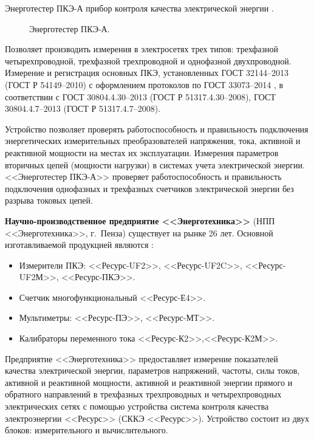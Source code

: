 Энерготестер ПКЭ-А прибор контроля качества электрической энергии \cite{energy_tester}.
\begin{figure}[ht]
	\caption{Энерготестер ПКЭ-А.}\label{fig:picture10}
\end{figure}
Позволяет производить измерения в электросетях трех типов: трехфазной четырехпроводной, трехфазной трехпроводной и однофазной двухпроводной. Измерение и регистрация основных ПКЭ, установленных ГОСТ 32144--2013 \cite{GOST32144-2013} (ГОСТ Р 54149--2010) с оформлением протоколов по ГОСТ 33073--2014 \cite{GOST33073-2014}, в соответствии с ГОСТ 30804.4.30--2013 \cite{GOST30804.4.30-2013} (ГОСТ Р 51317.4.30--2008), ГОСТ 30804.4.7--2013 \cite{GOST30804.4.7-2013} (ГОСТ Р 51317.4.7--2008). 

Устройство позволяет проверять работоспособность и правильность подключения энергетических измерительных преобразователей напряжения, тока, активной и реактивной мощности на местах их эксплуатации. Измерения параметров вторичных цепей (мощности нагрузки) в системах учета электрической энергии. <<Энерготестер ПКЭ-А>>  проверяет работоспособность и правильность подключения однофазных и трехфазных счетчиков электрической энергии без разрыва токовых цепей.

\textbf{Научно-производственное предприятие <<Энерготехника>>}  (НПП <<Энерготехника>>, г.~Пенза) существует на рынке 26 лет. Основной изготавливаемой продукцией являются \cite{энерготехника}: 

\begin{itemize}
	\item Измерители ПКЭ: <<Ресурс-UF2>>, <<Ресурс-UF2C>>, <<Ресурс-UF2М>>, <<Ресурс-ПКЭ>>.
	\item Счетчик многофункциональный <<Ресурс-Е4>>.
	\item Мультиметры: <<Ресурс-ПЭ>>, <<Ресурс-МТ>>.
	\item Калибраторы переменного тока <<Ресурс-К2>>,<<Ресурс-К2М>>.
\end{itemize}

Предприятие <<Энерготехника>> предоставляет измерение показателей качества электрической энергии, параметров напряжений, частоты, силы токов, активной и реактивной мощности, активной и реактивной энергии прямого и обратного направлений в трехфазных трехпроводных и четырехпроводных электрических сетях с помощью устройства система контроля качества электроэнергии <<Ресурс>> (СККЭ <<Ресурс>>). Устройство состоит из двух блоков: измерительного и  вычислительного.

